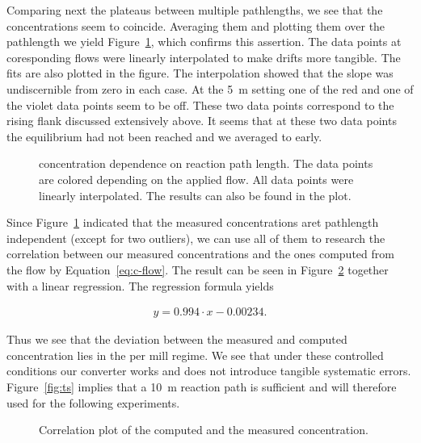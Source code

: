 Comparing next the  plateaus between multiple pathlengths, we
see that the concentrations seem to coincide. Averaging them and
plotting them over the pathlength we yield Figure~\ref{fig:no-length},
which confirms this assertion. The data points at coresponding flows
were linearly interpolated to make drifts more tangible. The fits are
also plotted in the figure. The interpolation showed that the slope
was undiscernible from zero in each case. At the \SI{5}{\meter}
setting one of the red and one of the violet data points seem to be
off. These two data points correspond to the rising flank discussed
extensively above. It seems that at these two data points the
equilibrium had not been reached and we averaged to early.

\begin{figure}[htbp]
  \centering
  
  \caption{ concentration dependence on reaction path
    length. The data points are colored depending on the applied
     flow. All data points were linearly interpolated. The
    results can also be found in the plot.}
  \label{fig:no-length}
\end{figure}

Since Figure~\ref{fig:no-length} indicated that the measured
concentrations aret pathlength independent (except for two outliers),
we can use all of them to research the correlation between our
measured concentrations and the ones computed from the flow by
Equation~\eqref{eq:c-flow}. The result can be seen in
Figure~\ref{fig:no-calib} together with a linear regression. The
regression formula yields

\begin{align*}
  y = 0.994 \cdot x -0.00234.
\end{align*}

Thus we see that the deviation between the measured and computed
concentration lies in the per mill regime. We see that under these
controlled conditions our converter works and does not introduce
tangible systematic errors. Figure~\ref{fig:ts} implies that a
\SI{10}{\meter} reaction path is sufficient and will therefore used
for the following experiments.

\begin{figure}[htbp]
  \centering
  
  \caption{Correlation plot of the computed and the measured 
    concentration.}
  \label{fig:no-calib}
\end{figure}

